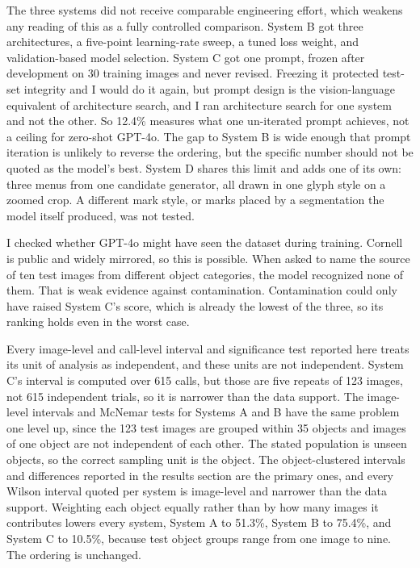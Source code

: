 \documentclass[12pt,letterpaper]{article}
\begin{document}
The three systems did not receive comparable engineering effort, which
weakens any reading of this as a fully controlled comparison. System B got three
architectures, a five-point learning-rate sweep, a tuned loss weight,
and validation-based model selection. System C got one prompt, frozen
after development on 30 training images and never revised. Freezing it
protected test-set integrity and I would do it again, but prompt design
is the vision-language equivalent of architecture search, and I ran
architecture search for one system and not the other. So 12.4\%
measures what one un-iterated prompt achieves, not a ceiling for
zero-shot GPT-4o. The gap to System B is wide enough that prompt
iteration is unlikely to reverse the ordering, but the specific number
should not be quoted as the model's best. System D shares this limit
and adds one of its own: three menus from one candidate generator, all
drawn in one glyph style on a zoomed crop. A different mark style, or
marks placed by a segmentation the model itself produced, was not
tested.

I checked whether GPT-4o might have seen the dataset during training.
Cornell is public and widely mirrored, so this is possible. When asked
to name the source of ten test images from different object categories,
the model recognized none of them. That is weak evidence against
contamination. Contamination could only have raised System C's score,
which is already the lowest of the three, so its ranking holds even in
the worst case.

Every image-level and call-level interval and significance test reported
here treats its unit of analysis as independent, and these units are
not independent. System C's interval is
computed over 615 calls, but those are five repeats of 123 images, not
615 independent trials, so it is narrower than the data support. The
image-level intervals and McNemar tests for Systems A and B have the
same problem one level up, since the 123 test images are grouped within
35 objects and images of one object are not independent of each other.
The stated population is unseen objects, so the correct sampling unit
is the object. The object-clustered intervals and differences reported
in the results section are the primary ones, and every Wilson interval
quoted per system is image-level and narrower than the data support.
Weighting each object equally rather than by how many images it
contributes lowers every system, System A to 51.3\%, System B to
75.4\%, and System C to 10.5\%, because test object groups range from
one image to nine. The ordering is unchanged.
\end{document}
